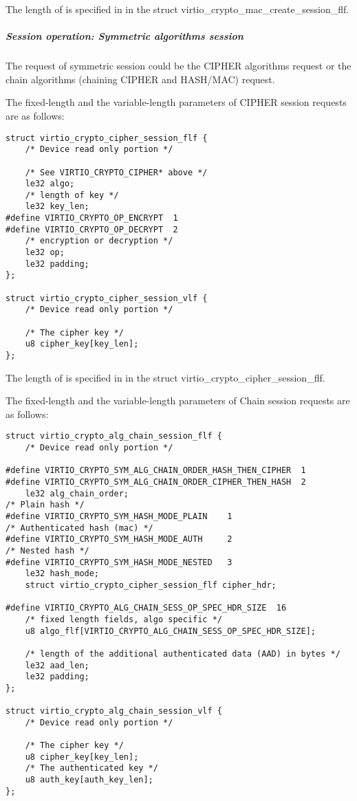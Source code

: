 The length of  is specified in  in the struct
virtio_crypto_mac_create_session_flf.


\subparagraph{Session operation: Symmetric algorithms session}\label{sec:Device Types / Crypto Device / Device
Operation / Control Virtqueue / Session operation / Session operation: Symmetric algorithms session}

The request of symmetric session could be the CIPHER algorithms request
or the chain algorithms (chaining CIPHER and HASH/MAC) request.

The fixed-length and the variable-length parameters of CIPHER session requests are as follows:

\begin{lstlisting}
struct virtio_crypto_cipher_session_flf {
    /* Device read only portion */

    /* See VIRTIO_CRYPTO_CIPHER* above */
    le32 algo;
    /* length of key */
    le32 key_len;
#define VIRTIO_CRYPTO_OP_ENCRYPT  1
#define VIRTIO_CRYPTO_OP_DECRYPT  2
    /* encryption or decryption */
    le32 op;
    le32 padding;
};

struct virtio_crypto_cipher_session_vlf {
    /* Device read only portion */

    /* The cipher key */
    u8 cipher_key[key_len];
};
\end{lstlisting}

The length of  is specified in  in the struct
virtio_crypto_cipher_session_flf.

The fixed-length and the variable-length parameters of Chain session requests are as follows:

\begin{lstlisting}
struct virtio_crypto_alg_chain_session_flf {
    /* Device read only portion */

#define VIRTIO_CRYPTO_SYM_ALG_CHAIN_ORDER_HASH_THEN_CIPHER  1
#define VIRTIO_CRYPTO_SYM_ALG_CHAIN_ORDER_CIPHER_THEN_HASH  2
    le32 alg_chain_order;
/* Plain hash */
#define VIRTIO_CRYPTO_SYM_HASH_MODE_PLAIN    1
/* Authenticated hash (mac) */
#define VIRTIO_CRYPTO_SYM_HASH_MODE_AUTH     2
/* Nested hash */
#define VIRTIO_CRYPTO_SYM_HASH_MODE_NESTED   3
    le32 hash_mode;
    struct virtio_crypto_cipher_session_flf cipher_hdr;

#define VIRTIO_CRYPTO_ALG_CHAIN_SESS_OP_SPEC_HDR_SIZE  16
    /* fixed length fields, algo specific */
    u8 algo_flf[VIRTIO_CRYPTO_ALG_CHAIN_SESS_OP_SPEC_HDR_SIZE];

    /* length of the additional authenticated data (AAD) in bytes */
    le32 aad_len;
    le32 padding;
};

struct virtio_crypto_alg_chain_session_vlf {
    /* Device read only portion */

    /* The cipher key */
    u8 cipher_key[key_len];
    /* The authenticated key */
    u8 auth_key[auth_key_len];
};
\end{lstlisting}

